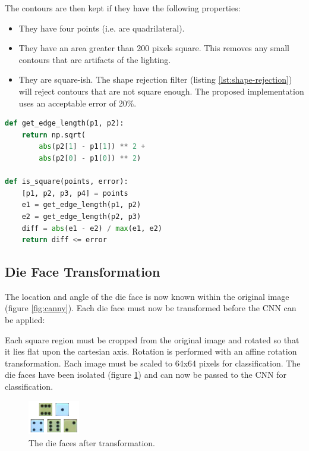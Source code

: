 \documentclass[conference]{IEEEtran}
\begin{document}
The contours are then kept if they have the following properties:
\begin{itemize}
	\item They have four points (i.e. are quadrilateral).
	\item They have an area greater than 200 pixels square. This removes any small contours that are artifacts of the lighting.
	\item They are square-ish. The shape rejection filter (listing \ref{lst:shape-rejection}) will reject contours that are not square enough.
		The proposed implementation uses an acceptable error of 20\%.
\end{itemize}
\begin{lstlisting}[language=python, caption={The shape rejection filter in Python.}, label={lst:shape-rejection}]
def get_edge_length(p1, p2):
    return np.sqrt(
    	abs(p2[1] - p1[1]) ** 2 +
    	abs(p2[0] - p1[0]) ** 2)

def is_square(points, error):
    [p1, p2, p3, p4] = points
    e1 = get_edge_length(p1, p2)
    e2 = get_edge_length(p2, p3)
    diff = abs(e1 - e2) / max(e1, e2)
    return diff <= error
\end{lstlisting}


\subsection{Die Face Transformation}

The location and angle of the die face is now known within the original image (figure \ref{fig:canny}).
Each die face must now be transformed before the CNN can be applied:

Each square region must be cropped from the original image and rotated so that it lies flat upon the cartesian axis.
Rotation is performed with an affine rotation transformation.
Each image must be scaled to 64x64 pixels for classification.
The die faces have been isolated (figure \ref{fig:faces}) and can now be passed to the CNN for classification.
\begin{figure}
	\centering
	\includegraphics[width=0.2\textwidth]{faces}
	\caption{The die faces after transformation.}
	\label{fig:faces}
\end{figure}
\end{document}
